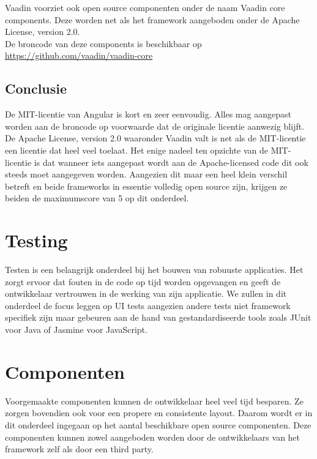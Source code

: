 Vaadin voorziet ook open source componenten onder de naam Vaadin core components. Deze worden net als het framework aangeboden onder de Apache License, version 2.0.
\\ De broncode van deze components is beschikbaar op 
\\ \url{https://github.com/vaadin/vaadin-core }

\subsection{Conclusie}
De MIT-licentie van Angular is kort en zeer eenvoudig. Alles mag aangepast worden aan de broncode op voorwaarde dat de originale licentie aanwezig blijft. 
De Apache License, version 2.0 waaronder Vaadin valt is net als de MIT-licentie een licentie dat heel veel toelaat. Het enige nadeel ten opzichte van de MIT-licentie is dat wanneer iets aangepast wordt aan de Apache-licensed code dit ook steeds moet aangegeven worden.
Aangezien dit maar een heel klein verschil betreft en beide frameworks in essentie volledig open source zijn, krijgen ze beiden de maximumscore van 5 op dit onderdeel.

\section{Testing}
Testen is een belangrijk onderdeel bij het bouwen van robuuste applicaties. Het zorgt ervoor dat fouten in de code op tijd worden opgevangen en geeft de ontwikkelaar vertrouwen in de werking van zijn applicatie. We zullen in dit onderdeel de focus leggen op UI tests aangezien andere tests niet framework specifiek zijn maar gebeuren aan de hand van gestandardiseerde tools zoals JUnit voor Java of Jasmine voor JavaScript.

\section{ Componenten}
Voorgemaakte componenten kunnen de ontwikkelaar heel veel tijd besparen. Ze zorgen bovendien ook voor een propere en consistente layout. Daarom wordt er in dit onderdeel ingegaan op het aantal beschikbare open source componenten. Deze componenten kunnen zowel aangeboden worden door de ontwikkelaars van het framework zelf als door een third party.

